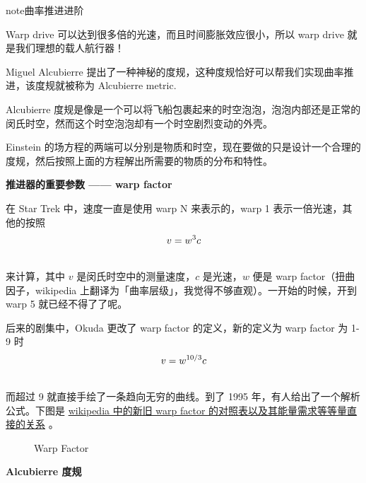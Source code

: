 \documentclass[letterpaper,10pt]{sphinxmanual}
\begin{document}
\begin{notice}{note}{曲率推进进阶}

Warp drive 可以达到很多倍的光速，而且时间膨胀效应很小，所以 warp drive 就是我们理想的载人航行器！

Miguel Alcubierre 提出了一种神秘的度规，这种度规恰好可以帮我们实现曲率推进，该度规就被称为 Alcubierre metric.

Alcubierre 度规是像是一个可以将飞船包裹起来的时空泡泡，泡泡内部还是正常的闵氏时空，然而这个时空泡泡却有一个时空剧烈变动的外壳。

Einstein 的场方程的两端可以分别是物质和时空，现在要做的只是设计一个合理的度规，然后按照上面的方程解出所需要的物质的分布和特性。

\textbf{推进器的重要参数 —— warp factor}

在 Star Trek 中，速度一直是使用 warp N 来表示的，warp 1 表示一倍光速，其他的按照
\begin{gather}
\begin{split}v=w^3c\end{split}\notag\\\begin{split}\end{split}\notag
\end{gather}
来计算，其中 $v$ 是闵氏时空中的测量速度，$c$ 是光速，$w$ 便是 warp factor（扭曲因子，wikipedia 上翻译为「曲率层级」，我觉得不够直观）。一开始的时候，开到 warp 5 就已经不得了了呢。

后来的剧集中，Okuda 更改了 warp factor 的定义，新的定义为 warp factor 为 1-9 时
\begin{gather}
\begin{split}v=w^{10/3}c\end{split}\notag\\\begin{split}\end{split}\notag
\end{gather}
而超过 9 就直接手绘了一条趋向无穷的曲线。到了 1995 年，有人给出了一个解析公式。下图是 \href{http://en.wikipedia.org/wiki/File:Warptable.gif}{wikipedia 中的新旧 warp factor 的对照表以及其能量需求等等量直接的关系} 。
\begin{figure}[htbp]
\centering
\capstart
\caption{Warp Factor}\end{figure}

\textbf{Alcubierre 度规}


\end{notice}
\end{document}
